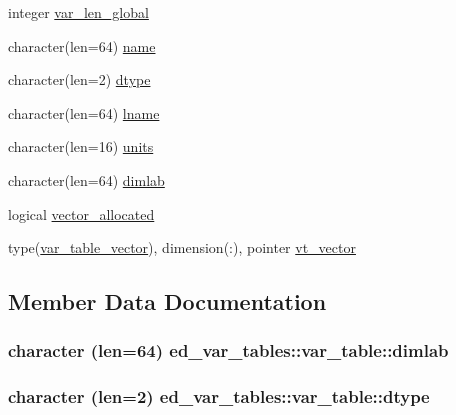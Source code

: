 \begin{DoxyCompactItemize}
integer \hyperlink{structed__var__tables_1_1var__table_a91dcf30550c2ee08ef0b4d74e7b8b64f}{var\+\_\+len\+\_\+global}
\item 
character(len=64) \hyperlink{structed__var__tables_1_1var__table_a0af071c5053800dc0920095f9ad100e3}{name}
\item 
character(len=2) \hyperlink{structed__var__tables_1_1var__table_a9c4a28ac74562c96c391f23cc8129805}{dtype}
\item 
character(len=64) \hyperlink{structed__var__tables_1_1var__table_a8e810273668252a3361505190f597c1e}{lname}
\item 
character(len=16) \hyperlink{structed__var__tables_1_1var__table_a08749e252d2a12144da6bf5bd1956f26}{units}
\item 
character(len=64) \hyperlink{structed__var__tables_1_1var__table_a0909c2a3703ab2bdf07815ad0ba14aae}{dimlab}
\item 
logical \hyperlink{structed__var__tables_1_1var__table_a41255913720040623a6bf9dd5b8267c5}{vector\+\_\+allocated}
\item 
type(\hyperlink{structed__var__tables_1_1var__table__vector}{var\+\_\+table\+\_\+vector}), dimension(\+:), pointer \hyperlink{structed__var__tables_1_1var__table_a3eacba058cb9fcc8bef162cbcfb0d106}{vt\+\_\+vector}
\end{DoxyCompactItemize}


\subsection{Member Data Documentation}
\hypertarget{structed__var__tables_1_1var__table_a0909c2a3703ab2bdf07815ad0ba14aae}{}
\subsubsection[{dimlab}]{\setlength{\rightskip}{0pt plus 5cm}character (len=64) ed\+\_\+var\+\_\+tables\+::var\+\_\+table\+::dimlab}\label{structed__var__tables_1_1var__table_a0909c2a3703ab2bdf07815ad0ba14aae}
\hypertarget{structed__var__tables_1_1var__table_a9c4a28ac74562c96c391f23cc8129805}{}
\subsubsection[{dtype}]{\setlength{\rightskip}{0pt plus 5cm}character (len=2) ed\+\_\+var\+\_\+tables\+::var\+\_\+table\+::dtype}\label{structed__var__tables_1_1var__table_a9c4a28ac74562c96c391f23cc8129805}
\hypertarget{structed__var__tables_1_1var__table_a312ab422b41cea5db01740c068855330}{}
